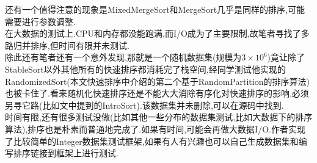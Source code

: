 \documentclass[UTF8]{ctexart}
\begin{document}
\indent
还有一个值得注意的现象是MixedMergeSort和MergeSort几乎是同样的排序,可能需要进行参数调整.\\
\indent
在大数据的测试上.CPU和内存都没能跑满,而I/O成为了主要限制,故笔者寻找了多路归并排序,但时间有限并未测试.\\
\indent
除此还有笔者还有一个意外发现,那就是一个随机数据集(规模为$3\times 10^6$)竟让除了StableSort以外其他所有的快速排序都消耗完了栈空间,经同学测试他实现的RandomizedSort(本文快速排序中介绍的第二个基于RandomPartition的排序算法)也被卡住了.看来随机化快速排序还是不能大大消除有序化对快速排序的影响,必须另寻它路(比如文中提到的IntroSort).该数据集并未删除,可以在源码中找到.\\
\indent
时间有限,还有很多测试没做(比如其他一些分布的数据集测试,比如大数据下的排序算法),排序也是朴素而普通地完成了.如果有时间,可能会再做大数据I/O.作者实现了比较简单的Integer数据集测试框架,如果有人有兴趣也可以自己生成数据集和编写排序链接到框架上进行测试.
\end{document}
